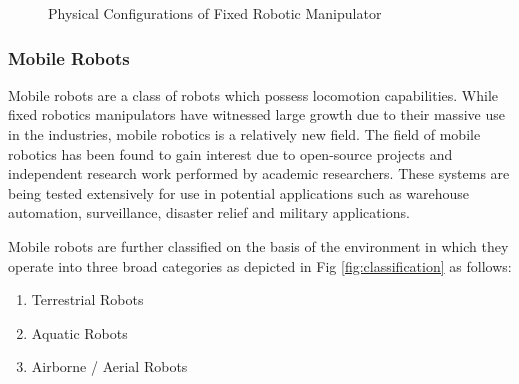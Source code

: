 \begin{spacing}{2}
\begin{figure}[h]
\caption[Caption for LOF]{Physical Configurations of Fixed Robotic Manipulator\protect\footnotemark}
\label{fig:manipulator_config}
\end{figure}
\subsubsection*{Mobile Robots}

Mobile robots are a class of robots which possess locomotion capabilities. While fixed robotics manipulators have witnessed large growth due to their massive use in the industries, mobile robotics is a relatively new field. The field of mobile robotics has been found to gain interest due to open-source projects and independent research work performed by academic researchers. These systems are being tested extensively for use in potential applications such as warehouse automation, surveillance, disaster relief and military applications.

Mobile robots are further classified on the basis of the environment in which they operate into three broad categories as depicted in Fig \ref{fig:classification} as follows:
\begin{enumerate}
    \item Terrestrial Robots
    \item Aquatic Robots
    \item Airborne / Aerial Robots
\end{enumerate}

\begin{figure}[h]
 

\end{figure}
\end{spacing}

